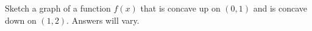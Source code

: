 {Sketch a graph of a function $f(x)$ that is concave up on $(0,1)$ and is concave down on $(1,2)$.
}
{Answers will vary.
}
